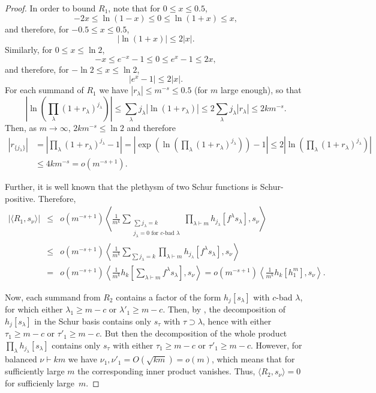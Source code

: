 \documentclass[12pt]%
{amsart}
\newcommand{\la}{{\lambda}}
\theoremstyle{plain}
\theoremstyle{definition}
\theoremstyle{remark}
\begin{document}
\begin{proof}
In order to bound $R_1$, note that for $0 \le x \le 0.5$,
\[
    -2x \le \ln(1-x) \le 0 \le \ln(1+x) \le x ,
\]
and therefore, for $-0.5 \le x \le 0.5$,
\[
    |\ln(1+x)| \le 2|x|.
\]
Similarly, for $0 \le x \le \ln 2$,
\[
    -x \le e^{-x} - 1 \le 0 \le e^x - 1 \le 2x,
\]
and therefore, for $-\ln 2 \le x \le \ln 2$,
\[
    |e^x - 1| \le 2|x|.
\]
For each summand of $R_1$ we have $|r_\la| \le m^{-s} \le 0.5$ (for $m$ large enough), so that
\[
    \left| \ln \left( \prod_\la(1+r_\la)^{j_\la} \right) \right|
    \le \sum_\la j_\la |\ln(1+r_\la)|
    \le 2 \sum_\la j_\la |r_\la|
    \le 2k m^{-s}.
\]
Then, as $m \to \infty$, $2k m^{-s} \le \ln 2$ and therefore
\begin{align*}
    |r_{\{j_\la\}}|
    &= \left| \prod_\la(1+r_\la)^{j_\la} - 1 \right|
    = \left| \exp \left( \ln \left( \prod_\la(1+r_\la)^{j_\la} \right) \right) -1 \right|
    \le 2 \left| \ln \left( \prod_\la(1+r_\la)^{j_\la} \right) \right| \\
    &\le 4k m^{-s}
    = o(m^{-s+1}).
\end{align*}

Further, it is well known that the plethysm of two Schur functions is Schur-positive.
Therefore,
\begin{eqnarray}
    |\langle R_1,s_\nu \rangle|
    &\le& o(m^{-s+1})\left\langle \frac{1}{m^k} \sum_{\substack{\sum j_\la=k \\ j_\la=0\text{ for $c$-bad }\la}} \prod_{\la\vdash m} h_{j_\la} \left[f^\la s_\la \right], s_\nu \right\rangle \\
    &\le& o(m^{-s+1}) \left\langle \frac{1}{m^k} \sum_{\sum j_\la=k} \prod_{\la\vdash m} h_{j_\la} \left[f^\la s_\la \right], s_\nu \right\rangle \nonumber \\
    &=& o(m^{-s+1}) \left\langle \frac{1}{m^k}h_k \left[ \sum_{\la\vdash m} f^\la s_\la \right], s_\nu \right\rangle
    = o(m^{-s+1}) \left\langle \frac{1}{m^k} h_k \left[h_1^m \right], s_\nu \right\rangle.
\label{sigma1}
\end{eqnarray}

Now, each summand from $R_2$ contains a factor of the form $h_{j}[s_\la]$ with $c$-bad $\la$, for which either $\la_1\ge m-c$ or $\la'_1\ge m-c$. Then, by \cite[Theorem~5.1]{GutierrezRosas}, the decomposition of $h_j[s_\la]$ in the Schur basis contains only $s_\tau$ with $\tau\supset\la$, hence with either $\tau_1\ge m-c$ or $\tau'_1\ge m-c$.
But then the decomposition of the whole product $\prod_\la h_{j_\la}[s_\la]$ contains only $s_\tau$ with either $\tau_1\ge m-c$ or $\tau'_1\ge m-c$.
However, for balanced $\nu\vdash km$ we have $\nu_1,\nu'_1=O(\sqrt{km})=o(m)$, which means that for sufficiently large $m$ the corresponding inner product vanishes. Thus, $\langle R_2,s_\nu\rangle=0$ for sufficienly large~$m$. 


\end{proof}
\end{document}
